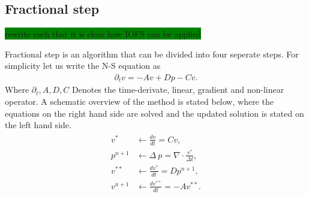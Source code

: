\subsection{Fractional step} 
\label{fracstep}
\colorbox{green}{rewrite such that it is clear how IOFS can be applied}


Fractional step is an algorithm that can be divided into four seperate steps. For simplicity let us write the N-S
equation as 
\begin{align}
    \partial_t v = -Av + Dp - Cv.
    \label{eq:NSfracstep}
\end{align}
Where $\partial_t, A,D,C$ Denotes the time-derivate, linear, gradient and non-linear operator. 
A schematic overview of the method is stated below, where the equations on the right hand side are 
solved and the updated solution is stated on the left hand side.
\begin{align}
    \begin{split}
        v^* &\leftarrow \frac{dv}{dt}=Cv,\\
    p^{n+1} &\leftarrow \Delta\: p = \nabla \cdot \frac{v^*}{\Delta t},\\
    v^{**} &\leftarrow  \frac{dv^*}{dt} =Dp^{n+1},\\
    v^{n+1} &\leftarrow \frac{dv^{**}}{dt}= -Av^{**}.
    \end{split}
    \label{eq:fracstep}
\end{align}

